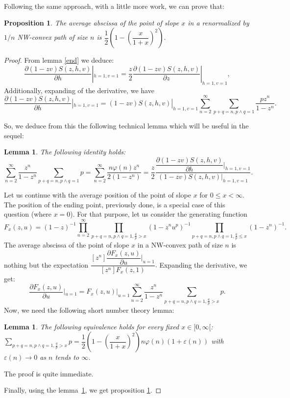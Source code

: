 \documentclass{article}
\newtheorem{lemma}[theorem]{Lemma}
\newtheorem{proposition}[theorem]{Proposition}
\begin{document}
Following the same approach, with a little more work, we can prove that:

\begin{proposition}
\label{prop:abs}
The average abscissa of the point of slope $x$ in a renormalized by $1/n$ 
NW-convex path of size $n$ is $\dfrac1{2}\left(1-\left(\dfrac{x}{1+x}\right)^2\right).$
\end{proposition}
\begin{proof}
From lemma \ref{end} we deduce:
$$\dfrac{\partial (1-zv)S(z,h,v)}{\partial h}|_{h=1,v=1}=\dfrac{z}{2}\dfrac{\partial (1-zv)S(z,h,v)}{\partial z}|_{h=1,v=1},$$
Additionally, expanding of the derivative, we have 
$$\dfrac{\partial (1-zv)S(z,h,v)}{\partial h}|_{h=1,v=1}=(1-zv)S(z,h,v)|_{h=1,v=1}\sum\limits_{n=2}^{\infty}\sum\limits_{p+q=n, p\wedge q=1}\dfrac{pz^n}{1-z^n}.$$

So, we deduce from this the following technical lemma which will be useful in the sequel:
\begin{lemma}\label{useful} The following identity holds:
$$\sum\limits_{n=2}^{\infty}\dfrac{z^n}{1-z^n}\sum\limits_{p+q=n, p\wedge q=1}p=\sum\limits_{n=2}^{\infty}\dfrac{n\varphi(n)z^n}{2(1-z^n)}=\dfrac{z}{2}\dfrac{\dfrac{\partial (1-zv)S(z,h,v)}{\partial h}|_{h=1,v=1}}{(1-zv)S(z,h,v)|_{h=1,v=1}}.$$
\end{lemma}

Let us continue with the average position of the point of slope $x$ for $0\leq x <\infty$. The position of the ending point, previously done, is a special case of this question (where $x=0$).
For that purpose, let us consider the generating function $$F_x(z,u)=(1-z)^{-1}\prod\limits_{n=2}^{\infty}\prod\limits_{p+q=n, p\wedge q=1, \frac{q}{p}>x}(1-z^{n}u^p)^{-1}\prod\limits_{p+q=n, p\wedge q=1, \frac{q}{p}\leq x}(1-z^{n})^{-1}.$$ The average abscissa of the point of slope $x$ in a NW-convex path of size $n$ is nothing but the expectation $\dfrac{[z^n]\dfrac{\partial F_x(z,u)}{\partial u}|_{u=1}}{[z^n]F_x(z,1)}.$ Expanding the derivative, we get:
$$\dfrac{\partial F_x(z,u)}{\partial u}|_{u=1}=F_x(z,u)|_{u=1}\sum\limits_{n=2}^{\infty}\dfrac{z^n}{1-z^n}\sum\limits_{p+q=n, p\wedge q=1,\frac{q}{p}>x}p.$$
Now, we need the following short number theory lemma:
\begin{lemma} The following equivalence holds for every fixed $x\in [0,\infty[$:\\ 
$\sum\limits_{p+q=n, p\wedge q=1,\frac{q}{p}>x}p=\dfrac1{2}\left(1-\left(\dfrac{x}{1+x}\right)^2\right)n\varphi(n)(1+\varepsilon(n))$ with $\varepsilon(n)\rightarrow 0$ as $n$ tends to $\infty$.
\end{lemma}
The proof is quite immediate. 

Finally, using the lemma~\ref{useful}, we get proposition \ref{prop:abs}.
\end{proof}
\end{document}
